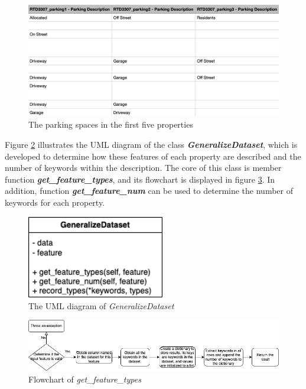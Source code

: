 \documentclass[12pt,twoside]{report}
\begin{document}
\begin{figure}[!htbp]
	\centering
	\includegraphics[width=12cm]{parking_dataset}
	\caption{The parking spaces in the first five properties}
	\label{parking_dataset}
\end{figure}

Figure \ref{uml_generalize_dataset} illustrates the UML diagram of the class \textit{\textbf{GeneralizeDataset}}, which is developed to determine how these features of each property are described and the number of keywords within the description. The core of this class is member function \textit{\textbf{get\_feature\_types}}, and its flowchart is displayed in figure \ref{generalize_dataset_get_feature_types}. In addition, function \textbf{\textit{get\_feature\_num}} can be used to determine the number of keywords for each property. 
\\

\begin{figure}[!htbp]
	\centering
	\includegraphics[width=6cm]{uml_generalize_dataset}
	\caption{The UML diagram of \textit{GeneralizeDataset}}
	\label{uml_generalize_dataset}
\end{figure}

\begin{figure}[!htbp]
	\centering
	\includegraphics[width=1\linewidth]{generalize_dataset_get_feature_types}
	\caption{Flowchart of \textit{get\_feature\_types}}
	\label{generalize_dataset_get_feature_types}
\end{figure}
\end{document}

